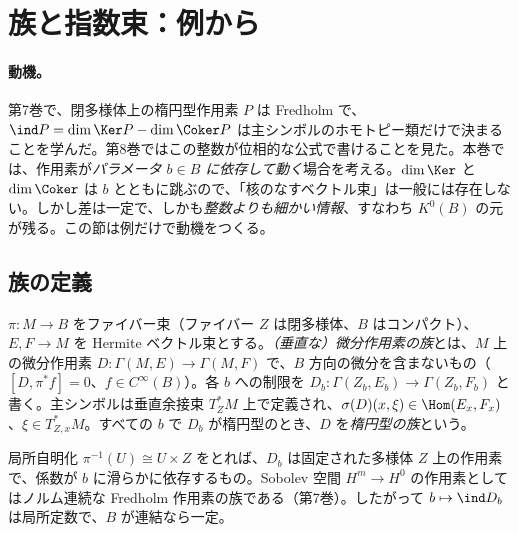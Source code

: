 
\section{族と指数束：例から}\label{sec:intro}
\paragraph{動機。}第7巻で、閉多様体上の楕円型作用素 $P$ は Fredholm で、$\ind P=\dim\Ker P-\dim\Coker P$ は主シンボルのホモトピー類だけで決まることを学んだ。第8巻ではこの整数が位相的な公式で書けることを見た。本巻では、作用素が\emph{パラメータ $b\in B$ に依存して動く}場合を考える。$\dim\Ker$ と $\dim\Coker$ は $b$ とともに跳ぶので、「核のなすベクトル束」は一般には存在しない。しかし差は一定で、しかも\emph{整数よりも細かい情報}、すなわち $K^0(B)$ の元が残る。この節は例だけで動機をつくる。

\subsection{族の定義}
\begin{defn}[楕円型作用素の族]\label{def:family}
$\pi:M\to B$ をファイバー束（ファイバー $Z$ は閉多様体、$B$ はコンパクト）、$E,F\to M$ を Hermite ベクトル束とする。\emph{（垂直な）微分作用素の族}とは、$M$ 上の微分作用素 $D:\Gamma(M,E)\to\Gamma(M,F)$ で、$B$ 方向の微分を含まないもの（$[D,\pi^*f]=0$、$f\in C^\infty(B)$）。各 $b$ への制限を $D_b:\Gamma(Z_b,E_b)\to\Gamma(Z_b,F_b)$ と書く。主シンボルは垂直余接束 $T_Z^*M$ 上で定義され、$\sigma(D)(x,\xi)\in\Hom(E_x,F_x)$、$\xi\in T^*_{Z,x}M$。すべての $b$ で $D_b$ が楕円型のとき、$D$ を\emph{楕円型の族}という。
\end{defn}
局所自明化 $\pi^{-1}(U)\cong U\times Z$ をとれば、$D_b$ は固定された多様体 $Z$ 上の作用素で、係数が $b$ に滑らかに依存するもの。Sobolev 空間 $H^m\to H^0$ の作用素としてはノルム連続な Fredholm 作用素の族である（第7巻）。したがって $b\mapsto\ind D_b$ は局所定数で、$B$ が連結なら一定。

\begin{center}
\end{center}
